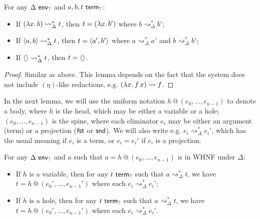 \documentclass[twoside]{report}
\begin{document}
\begin{proposition}
\label{thm:persistence_of_constructors}
For any $\Delta \ \mathsf{env}_{?}$ and $a, b, t \ \mathsf{term}_{?}$:
\begin{itemize}[noitemsep]
    \item If $(\lambda{x}.\,{b}) \rightsquigarrow_\Delta^\ast t$, then $t = (\lambda{x}.\,{b'})$ where $b \rightsquigarrow_\Delta^\ast {b'}$;
    \item If $\langle{a}, {b}\rangle \rightsquigarrow_\Delta^\ast t$, then $t = \langle{a'}, {b'}\rangle$ where $a \rightsquigarrow_\Delta^\ast {a'}$ and $b \rightsquigarrow_\Delta^\ast {b'}$;
    \item If $\langle\rangle \rightsquigarrow_\Delta^\ast t$, then $t = \langle\rangle$.
\end{itemize}
\end{proposition}

\begin{proof}
Similar as above. This lemma depends on the fact that the system does not include $(\eta)$-like reductions, e.g. $(\lambda{x}.\,{{f}\,{x}}) \rightsquigarrow f$.
\end{proof}

\newcommand{\form}[2]{{#1}\,@\,({#2})}
\newcommand{\sol}{\operatorname{sol}}

In the next lemma, we will use the uniform notation $\form h {e_0, \ldots, e_{n-1}}$ to denote a body, where $h$ is the head, which may be either a variable or a hole; $(e_0, \ldots, e_{n-1})$ is the spine, where each eliminator $e_i$ may be either an argument (term) or a projection ($\operatorname{\mathsf{fst}}$ or $\operatorname{\mathsf{snd}}$). We will also write e.g. $e_i \rightsquigarrow_\Delta^\ast e_i'$, which has the usual meaning if $e_i$ is a term, or $e_i = e_i'$ if $e_i$ is a projection.

\begin{proposition}
\label{thm:persistence_of_bodies}
For any $\Delta \ \mathsf{env}_{?}$ and $a$ such that $a = \form h {e_0, \ldots, e_{n-1}}$ is in WHNF under $\Delta$:
\begin{itemize}[noitemsep]
    \item If $h$ is a variable, then for any $t \ \mathsf{term}_{?}$ such that $a \rightsquigarrow_\Delta^\ast t$, we have $t = \form h {e_0', \ldots, e_{n-1}'}$ where each $e_i \rightsquigarrow_\Delta^\ast e_i'$;
    \item If $h$ is a hole, then for any $t \ \mathsf{term}_{?}$ such that $a \rightsquigarrow_\Delta^\ast t$, we have $t = \form h {e_0', \ldots, e_{n-1}'}$ where each $e_i \rightsquigarrow_\Delta^\ast e_i'$.
\end{itemize}
\end{proposition}
\end{document}
